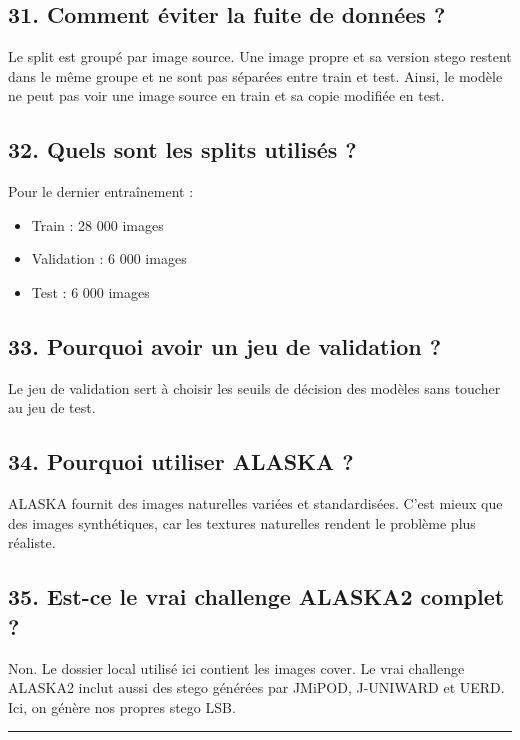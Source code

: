 \documentclass[11pt,a4paper]{article}
\begin{document}
\subsection{31. Comment éviter la fuite de données ?}

Le split est groupé par image source. Une image propre et sa version stego restent dans le même groupe et ne sont pas séparées entre train et test. Ainsi, le modèle ne peut pas voir une image source en train et sa copie modifiée en test.

\subsection{32. Quels sont les splits utilisés ?}

Pour le dernier entraînement :

\begin{itemize}
\item Train : 28 000 images
\item Validation : 6 000 images
\item Test : 6 000 images
\end{itemize}

\subsection{33. Pourquoi avoir un jeu de validation ?}

Le jeu de validation sert à choisir les seuils de décision des modèles sans toucher au jeu de test.

\subsection{34. Pourquoi utiliser ALASKA ?}

ALASKA fournit des images naturelles variées et standardisées. C'est mieux que des images synthétiques, car les textures naturelles rendent le problème plus réaliste.

\subsection{35. Est-ce le vrai challenge ALASKA2 complet ?}

Non. Le dossier local utilisé ici contient les images cover. Le vrai challenge ALASKA2 inclut aussi des stego générées par JMiPOD, J-UNIWARD et UERD. Ici, on génère nos propres stego LSB.

\hrule
\end{document}
